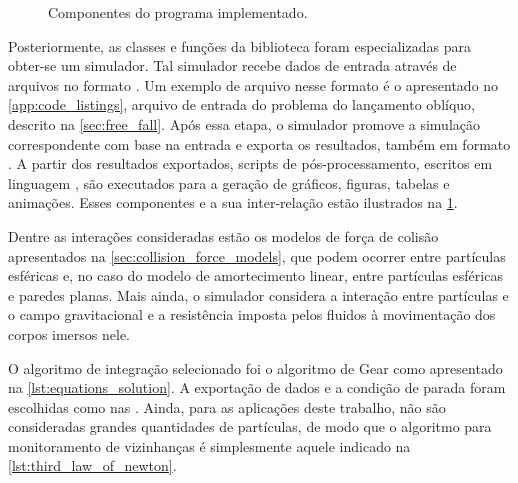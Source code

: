 \begin{figure}[h]
	\caption{Componentes do programa implementado.}
	\centering
		
	\label{fig:results:computational_implementation:complete_workflow}
	\sourceMe
\end{figure}

Posteriormente, as classes e funções da biblioteca foram especializadas para obter-se um simulador. Tal simulador recebe dados de entrada através de arquivos no formato \JSON{}. Um exemplo de arquivo nesse formato é o apresentado no \cref{app:code_listings}, arquivo de entrada do problema do lançamento oblíquo, descrito na \cref{sec:free_fall}. Após essa etapa, o simulador promove a simulação correspondente com base na entrada e exporta os resultados, também em formato \JSON{}. A partir dos resultados exportados, scripts de pós-processamento, escritos em linguagem \Python{}, são executados para a geração de gráficos, figuras, tabelas e animações. Esses componentes e a sua inter-relação estão ilustrados na \cref{fig:results:computational_implementation:complete_workflow}.

Dentre as interações consideradas estão os modelos de força de colisão apresentados na \cref{sec:collision_force_models}, que podem ocorrer entre partículas esféricas e, no caso do modelo de amortecimento linear, entre partículas esféricas e paredes planas. Mais ainda, o simulador considera a interação entre partículas e o campo gravitacional e a resistência imposta pelos fluidos à movimentação dos corpos imersos nele.

O algoritmo de integração selecionado foi o algoritmo de Gear como apresentado na \cref{lst:equations_solution}. A exportação de dados e a condição de parada foram escolhidas como nas  . Ainda, para as aplicações deste trabalho, não são consideradas grandes quantidades de partículas, de modo que o algoritmo para monitoramento de vizinhanças é simplesmente aquele indicado na \cref{lst:third_law_of_newton}.



